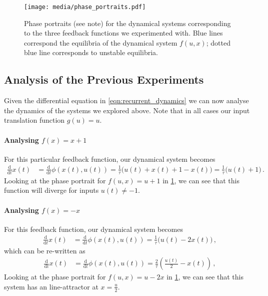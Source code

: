 \documentclass[10pt,letterpaper,oneside]{article}
\begin{document}
\begin{figure}
	\centering
	\texttt{[image: media/phase\_portraits.pdf]}
	\caption{Phase portraits (see note) for the dynamical systems corresponding to the three feedback functions we experimented with. Blue lines correspond the equilibria of the dynamical system $f(u, x)$; dotted blue line corresponds to unstable equilibria.  }
	\label{fig:phase_portraits}
\end{figure}

\subsection{Analysis of the Previous Experiments}

Given the differential equation in \cref{eqn:recurrent_dynamics} we can now analyse the dynamics of the systems we explored above. Note that in all cases our input translation function $g(u) = u$.

\paragraph{Analysing $f(x) = x + 1$}
For this particular feedback function, our dynamical system becomes
\begin{align*}
	\frac{\mathrm{d}}{\mathrm{d}t} x(t) &= \frac{\mathrm{d}}{\mathrm{d}t} \phi(x(t), u(t)) = \frac{1}{\tau} \big(u(t) + x(t) + 1 - x(t) \big) = \frac{1}{\tau} \big(u(t) + 1 \big) \,.
\end{align*}
Looking at the phase portrait for $f(u, x) = u + 1$ in \cref{fig:phase_portraits}, we can see that this function will diverge for inputs $u(t) \neq -1$.

\paragraph{Analysing $f(x) = -x$}
For this feedback function, our dynamical system becomes
\begin{align*}
	\frac{\mathrm{d}}{\mathrm{d}t} x(t) &= \frac{\mathrm{d}}{\mathrm{d}t} \phi(x(t), u(t)) = \frac{1}{\tau} \big(u(t) - 2 x(t) \big) \,,
\end{align*}
which can be re-written as
\begin{align*}
	\frac{\mathrm{d}}{\mathrm{d}t} x(t) &= \frac{\mathrm{d}}{\mathrm{d}t} \phi(x(t), u(t)) = \frac{2}{\tau} \left(\frac{u(t)}{2} - x(t) \right) \,,
\end{align*}
Looking at the phase portrait for $f(u, x) = u - 2x$ in \cref{fig:phase_portraits}, we can see that this system has an line-attractor at $x = \frac{u}{2}$.
\end{document}
